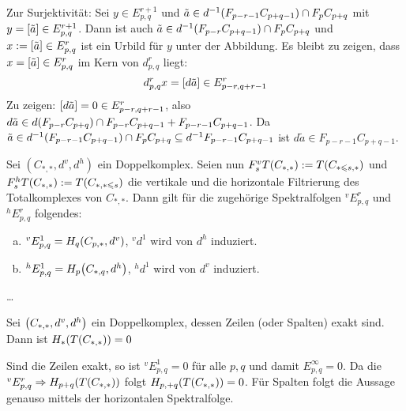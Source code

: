 \begin{beweis}
	Zur Surjektivität: Sei $y \in E^{r+1}_{p,q}$ und $\tilde{a} \in d^{-1} \enbrace*{F_{p-r-1} C_{p+q-1}}\cap F_p C_{p+q}$ mit $y = \benbrace*{\tilde{a}} \in E^{r+1}_{p,q}$.
	Dann ist auch $\tilde{a} \in d^{-1} \enbrace*{F_{p-r} C_{p+q-1}} \cap F_p C_{p+q}$ und $x := \benbrace*{\tilde{a}} \in E^r_{p,q}$ ist ein Urbild für $y$ unter der Abbildung.
	Es bleibt zu zeigen, dass $x =\benbrace*{\tilde{a}} \in E^r_{p,q}$ im Kern von $d^r_{p,q}$ liegt:
	\[
		d^r_{p,q} x = \benbrace*{d \tilde{a}} \in E^r_{p-r,q+r-1}
	\]
	Zu zeigen: $\benbrace*{d \tilde{a}} =0 \in E^r_{p-r,q+r-1}$, also $d \tilde{a} \in d \enbrace*{F_{p-r} C_{p+q}} \cap F_{p-r} C_{p+q-1} + F_{p-r-1} C_{p+q-1}$.
	Da $\tilde{a} \in d^{-1} \enbrace*{F_{p-r-1} C_{p+q-1}}\cap F_p C_{p+q} \subseteq d^{-1} F_{p-r-1} C_{p+q-1}$ ist $d\tilde{a} \in F_{p-r-1} C_{p+q-1}$. 
\end{beweis}

\begin{proposition}
	Sei $(C_{*,*},d^v,d^h)$ ein Doppelkomplex.
	Seien nun $F^v_s T(C_{*,*}) := T \enbrace*{C_{*\le s,*}}$ und $F^h_s T(C_{*,*}) := T \enbrace*{C_{*,*\le s}}$ die vertikale und die horizontale Filtrierung des Totalkomplexes von $C_{*,*}$.
	Dann gilt für die zugehörige Spektralfolgen $^v E^r_{p,q}$ und $^h E^r_{p,q}$ folgendes:
	\begin{enumerate}[a)]
		\item $^v E^1_{p,q} = H_q \enbrace*{C_{p,*},d^v}$, $^v d^1$ wird von $d^h$ induziert.
		\item $^h E^1_{p,q} = H_p \enbrace*{C_{*,q},d^h}$, $^h d^1$ wird von $d^v$ induziert.
	\end{enumerate}
\end{proposition}
\begin{beweis}
	\ldots 
\end{beweis}

\begin{korollar}
	Sei $\enbrace*{C_{*,*},d^v,d^h}$ ein Doppelkomplex, dessen Zeilen (oder Spalten) exakt sind.
	Dann ist $H_* \enbrace*{T(C_{*,*})}=0$
\end{korollar}
\begin{beweis}
	Sind die Zeilen exakt, so ist $^vE^1_{p,q}=0$ für alle $p,q$ und damit $E^\infty_{p,q}=0$.
	Da die $^v E^r_{p,q} \Rightarrow H_{p+q} \enbrace*{T(C_{*,*})}$ folgt $H_{p,+q} \enbrace*{T(C_{*,*})}=0$.
	Für Spalten folgt die Aussage genauso mittels der horizontalen Spektralfolge.
\end{beweis}
\newpage

